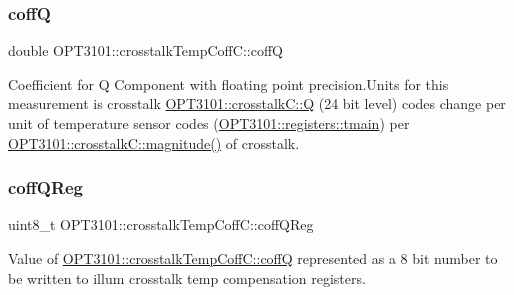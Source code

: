 \mbox{\label{class_o_p_t3101_1_1crosstalk_temp_coff_c_a468edb62fe09f0117c59ed5c2ec11e3b}} 
\subsubsection{\texorpdfstring{coffQ}{coffQ}}
{\footnotesize\ttfamily double O\+P\+T3101\+::crosstalk\+Temp\+Coff\+C\+::coffQ}



Coefficient for Q Component with floating point precision.\+Units for this measurement is crosstalk \mbox{\hyperlink{class_o_p_t3101_1_1crosstalk_c_a1e20d913baf2432ec90fe06a45c226db}{O\+P\+T3101\+::crosstalk\+C\+::Q}} (24 bit level) codes change per unit of temperature sensor codes (\mbox{\hyperlink{class_o_p_t3101_1_1registers_a3dfd8d81d4cb04d274007deb7c6122fc}{O\+P\+T3101\+::registers\+::tmain}}) per \mbox{\hyperlink{class_o_p_t3101_1_1crosstalk_c_a3f569027c07fb3fb49a02ae3108e34c1}{O\+P\+T3101\+::crosstalk\+C\+::magnitude()}} of crosstalk. 

\mbox{\label{class_o_p_t3101_1_1crosstalk_temp_coff_c_ae45f7932044d4d343f5f4d17ef0264c8}} 
\subsubsection{\texorpdfstring{coff\+Q\+Reg}{coffQReg}}
{\footnotesize\ttfamily uint8\+\_\+t O\+P\+T3101\+::crosstalk\+Temp\+Coff\+C\+::coff\+Q\+Reg}



Value of \mbox{\hyperlink{class_o_p_t3101_1_1crosstalk_temp_coff_c_a468edb62fe09f0117c59ed5c2ec11e3b}{O\+P\+T3101\+::crosstalk\+Temp\+Coff\+C\+::coffQ}} represented as a 8 bit number to be written to illum crosstalk temp compensation registers. 

\mbox{\label{class_o_p_t3101_1_1crosstalk_temp_coff_c_a0ff621323b7f23672af224efca88e01e}} 
